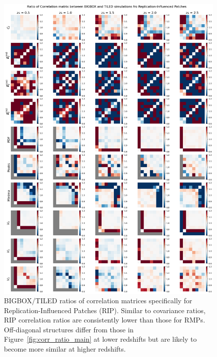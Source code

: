 \begin{figure}[p]
    \centering
    \includegraphics[width=\textwidth]{figures/results/corr_ratio_RIP.png}
    \caption[Correlation Ratios for RIP]{BIGBOX/TILED ratios of correlation matrices specifically for Replication-Influenced Patches (RIP). Similar to covariance ratios, RIP correlation ratios are consistently lower than those for RMPs. Off-diagonal structures differ from those in Figure~\ref{fig:corr_ratio_main} at lower redshifts but are likely to become more similar at higher redshifts.}
    \label{fig:boxreplication_corr_RIP}
\end{figure}

\clearpage